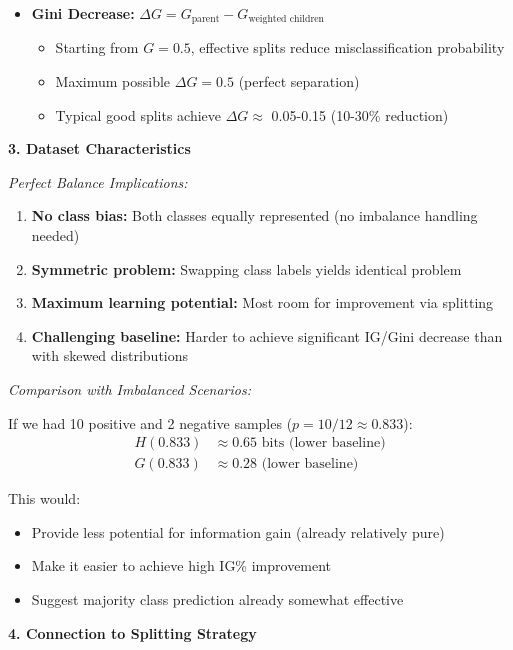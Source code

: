 \documentclass[12pt]{article}
\begin{document}
\begin{explanation}
\begin{itemize}
    \item \textbf{Gini Decrease:} $\Delta G = G_{\text{parent}} - G_{\text{weighted children}}$
    \begin{itemize}
        \item Starting from $G = 0.5$, effective splits reduce misclassification probability
        \item Maximum possible $\Delta G = 0.5$ (perfect separation)
        \item Typical good splits achieve $\Delta G \approx$ 0.05-0.15 (10-30\% reduction)
    \end{itemize}
\end{itemize}

\textbf{3. Dataset Characteristics}

\textit{Perfect Balance Implications:}

\begin{enumerate}
    \item \textbf{No class bias:} Both classes equally represented (no imbalance handling needed)
    \item \textbf{Symmetric problem:} Swapping class labels yields identical problem
    \item \textbf{Maximum learning potential:} Most room for improvement via splitting
    \item \textbf{Challenging baseline:} Harder to achieve significant IG/Gini decrease than with skewed distributions
\end{enumerate}

\textit{Comparison with Imbalanced Scenarios:}

If we had 10 positive and 2 negative samples ($p = 10/12 \approx 0.833$):
\begin{align*}
H(0.833) &\approx 0.65 \text{ bits (lower baseline)} \\
G(0.833) &\approx 0.28 \text{ (lower baseline)}
\end{align*}

This would:
\begin{itemize}
    \item Provide less potential for information gain (already relatively pure)
    \item Make it easier to achieve high IG\% improvement
    \item Suggest majority class prediction already somewhat effective
\end{itemize}

\textbf{4. Connection to Splitting Strategy}


\end{explanation}
\end{document}
